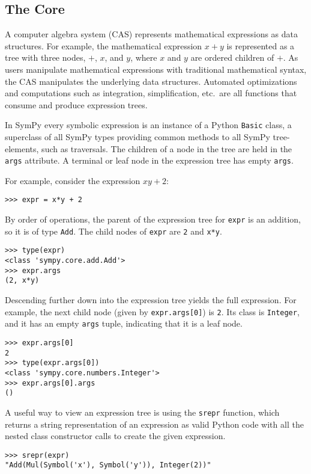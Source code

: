 
\subsection{The Core}

A computer algebra system (CAS) represents mathematical expressions as data
structures.  For example, the mathematical expression $x + y$ is represented as
a tree with three nodes, $+$, $x$, and $y$, where $x$ and $y$ are ordered
children of $+$.  As users manipulate
mathematical expressions with traditional mathematical syntax, the CAS
manipulates the underlying data structures.  Automated optimizations and
computations such as integration, simplification, etc.\ are all functions that
consume and produce expression trees.

In SymPy every symbolic expression is an instance of a Python \texttt{Basic}
class, a superclass of all SymPy types providing common methods to all SymPy
tree-elements, such as traversals.  The children of a node in the
tree are held in the \texttt{args} attribute.  A terminal or leaf node in the
expression tree has empty \texttt{args}.

For example, consider the expression $xy + 2$:
\begin{verbatim}
>>> expr = x*y + 2
\end{verbatim}
By order of operations, the parent of the expression tree for \texttt{expr} is
an addition, so it is of type \texttt{Add}. The child nodes of \texttt{expr} are
\texttt{2} and \texttt{x*y}.
\begin{verbatim}
>>> type(expr)
<class 'sympy.core.add.Add'>
>>> expr.args
(2, x*y)
\end{verbatim}

Descending further down into the expression tree yields the full expression. For
example, the next child node (given by \texttt{expr.args[0]}) is
\texttt{2}. Its class is \texttt{Integer}, and it has an empty \texttt{args}
tuple, indicating that it is a leaf node.
\begin{verbatim}
>>> expr.args[0]
2
>>> type(expr.args[0])
<class 'sympy.core.numbers.Integer'>
>>> expr.args[0].args
()
\end{verbatim}

A useful way to view an expression tree is using the \texttt{srepr} function, which
returns a string representation of an expression as valid Python code
with all the nested class constructor calls to create the given expression.
\begin{verbatim}
>>> srepr(expr)
"Add(Mul(Symbol('x'), Symbol('y')), Integer(2))"
\end{verbatim}

